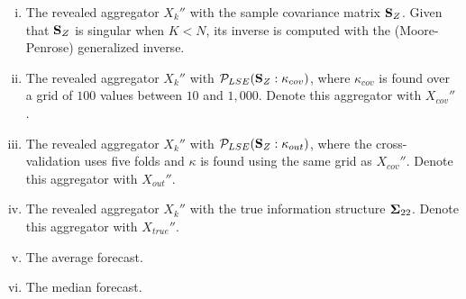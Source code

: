 \documentclass[11pt]{article}
\theoremstyle{definition}
\theoremstyle{definition}
\def\bSigma{{\bf \Sigma}}
\def\SS{{\bf S}}
\begin{document}
\begin{enumerate}[i)]
\item  The revealed aggregator  $X_k''$ with the sample covariance matrix $\SS_Z$. Given that $\SS_Z$ is singular when $K<N$, its inverse is computed with the (Moore-Penrose) generalized inverse.
\item The revealed aggregator $X_k''$ with $\mathcal{P}_{LSE}(\SS_Z : \kappa_{cov})$, where $\kappa_{cov}$ is found over a grid of $100$ values between $10$ and $1,000$. Denote this aggregator with $X_{cov}''$. 
\item The revealed aggregator  $X_k''$ with  $\mathcal{P}_{LSE}(\SS_Z : \kappa_{out})$,  
where the cross-validation uses five folds and $\kappa$ is found using the same grid as $X_{cov}''$. Denote this aggregator with  $X_{out}''$. 
\item  The revealed aggregator  $X_k''$ with the true information structure $\bSigma_{22}$. Denote this aggregator with $X_{true}''$. 
\item The average forecast.
\item The median forecast.
\end{enumerate}
\end{document}
